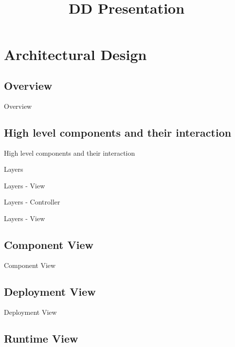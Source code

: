 \documentclass{../common/latex_classes/pdf_presentation}
\title{DD Presentation}
\begin{document}
	\titleToc{}
	\section{Architectural Design}
	
	\subsection{Overview}
	
	\begin{frame}{Overview}
	\end{frame}
	
	\subsection{High level components and their interaction}
	
	\begin{frame}{High level components and their interaction}
	\end{frame}
	
	\begin{frame}{Layers}
	\end{frame}
	
	\begin{frame}{Layers - View}
	\end{frame}
	
	\begin{frame}{Layers - Controller}
	\end{frame}
	
	\begin{frame}{Layers - View}
	\end{frame}
	
	\subsection{Component View}
	
	\begin{frame}{Component View}
	\end{frame}
	
	\subsection{Deployment View}
		
	\begin{frame}{Deployment View}
	\end{frame}
	
	\subsection{Runtime View}
		
\end{document}
